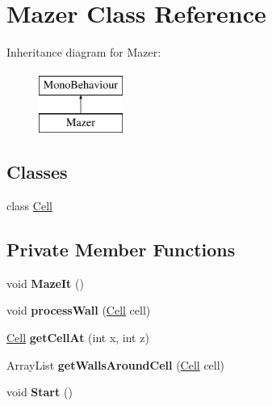 \hypertarget{class_mazer}{}\section{Mazer Class Reference}
\label{class_mazer}
Inheritance diagram for Mazer\+:\begin{figure}[H]
\begin{center}
\leavevmode
\includegraphics[height=2.000000cm]{class_mazer}
\end{center}
\end{figure}
\subsection*{Classes}
\begin{DoxyCompactItemize}
\item 
class \mbox{\hyperlink{class_mazer_1_1_cell}{Cell}}
\end{DoxyCompactItemize}
\subsection*{Private Member Functions}
\begin{DoxyCompactItemize}
\item 
\mbox{\label{class_mazer_a859b989d57612151293ed072aece7b88}} 
void {\bfseries Maze\+It} ()
\item 
\mbox{\label{class_mazer_af7856b17f3e8796b34dbb64bc31af6bc}} 
void {\bfseries process\+Wall} (\mbox{\hyperlink{class_mazer_1_1_cell}{Cell}} cell)
\item 
\mbox{\label{class_mazer_a67db642df10e17ebd7a0a02913a5b2ed}} 
\mbox{\hyperlink{class_mazer_1_1_cell}{Cell}} {\bfseries get\+Cell\+At} (int x, int z)
\item 
\mbox{\label{class_mazer_ad62ec1c2bf58c074db995f599e2df029}} 
Array\+List {\bfseries get\+Walls\+Around\+Cell} (\mbox{\hyperlink{class_mazer_1_1_cell}{Cell}} cell)
\item 
\mbox{\label{class_mazer_a0adfca8bdff46038f95d138b9a8eadc6}} 
void {\bfseries Start} ()
\end{DoxyCompactItemize}
